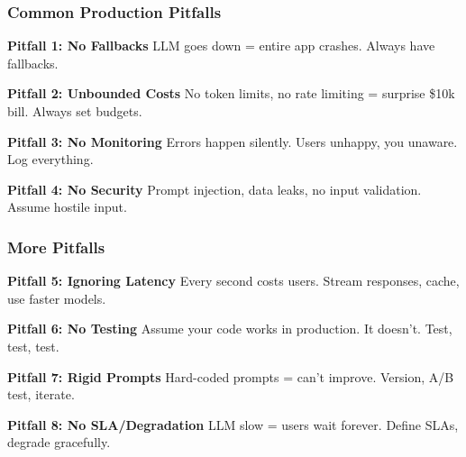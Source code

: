 \documentclass[aspectratio=169,11pt]{beamer}
\begin{document}
\begin{frame}
\frametitle{Common Production Pitfalls}

\small
\textbf{Pitfall 1: No Fallbacks}
LLM goes down = entire app crashes. Always have fallbacks.

\vspace{0.7em}

\textbf{Pitfall 2: Unbounded Costs}
No token limits, no rate limiting = surprise \$10k bill. Always set budgets.

\vspace{0.7em}

\textbf{Pitfall 3: No Monitoring}
Errors happen silently. Users unhappy, you unaware. Log everything.

\vspace{0.7em}

\textbf{Pitfall 4: No Security}
Prompt injection, data leaks, no input validation. Assume hostile input.

\end{frame}

\begin{frame}
\frametitle{More Pitfalls}

\small
\textbf{Pitfall 5: Ignoring Latency}
Every second costs users. Stream responses, cache, use faster models.

\vspace{0.7em}

\textbf{Pitfall 6: No Testing}
Assume your code works in production. It doesn't. Test, test, test.

\vspace{0.7em}

\textbf{Pitfall 7: Rigid Prompts}
Hard-coded prompts = can't improve. Version, A/B test, iterate.

\vspace{0.7em}

\textbf{Pitfall 8: No SLA/Degradation}
LLM slow = users wait forever. Define SLAs, degrade gracefully.

\end{frame}
\end{document}
